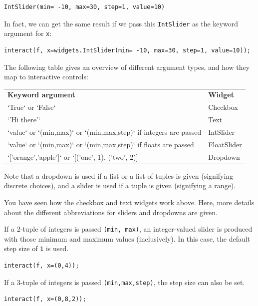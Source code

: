 \begin{verbatim}
IntSlider(min= -10, max=30, step=1, value=10)
\end{verbatim}

In fact, we can get the same result if we pass this \texttt{IntSlider} as the keyword argument for \texttt{x}:

\begin{verbatim}
interact(f, x=widgets.IntSlider(min= -10, max=30, step=1, value=10));
\end{verbatim}

The following table gives an overview of different argument types, and how they map to interactive controls:

\bigskip\noindent
\begin{tabular}{p{}p{}}
\toprule
\textbf{Keyword argument} & \textbf{Widget} \\
`True` or `False` & Checkbox \\
`'Hi there'` & Text \\
`value` or `(min,max)` or `(min,max,step)` if integers are passed & IntSlider \\
`value` or `(min,max)` or `(min,max,step)` if floats are passed & FloatSlider \\
`['orange','apple']` or `[('one', 1), ('two', 2)] & Dropdown \\
\bottomrule
\end{tabular}

\bigskip

Note that a dropdown is used if a list or a list of tuples is given (signifying discrete choices), and a slider is used if a tuple is given (signifying a range).

You have seen how the checkbox and text widgets work above. Here, more details about the different abbreviations for sliders and dropdowns are given.

If a 2-tuple of integers is passed \texttt{(min, max)}, an integer-valued slider is produced with those minimum and maximum values (inclusively). In this case, the default step size of \texttt{1} is used.

\begin{verbatim}
interact(f, x=(0,4));
\end{verbatim}

If a 3-tuple of integers is passed \texttt{(min,max,step)}, the step size can also be set.

\begin{verbatim}
interact(f, x=(0,8,2));
\end{verbatim}

